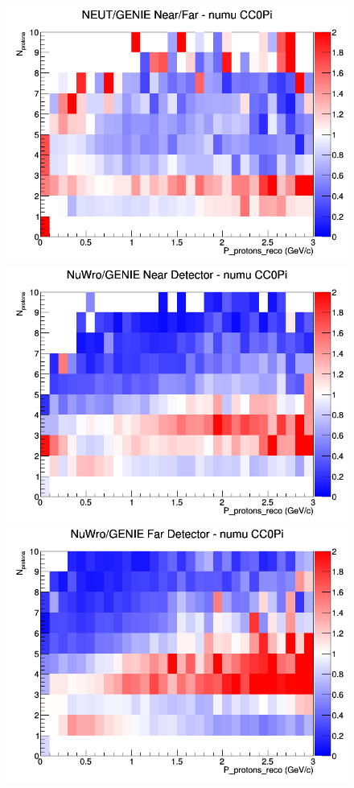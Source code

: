 \begin{figure}[h]
\endminipage
{}
\includegraphics[width=\linewidth]{eff_N_P/FGT/protons/ratios/CC0Pi_NEUT_GENIE_numu_NF_N_P.png}
\endminipage
\newline
{}
\includegraphics[width=\linewidth]{eff_N_P/FGT/protons/ratios/CC0Pi_NuWro_GENIE_numu_near_N_P.png}
\endminipage
{}
\includegraphics[width=\linewidth]{eff_N_P/FGT/protons/ratios/CC0Pi_NuWro_GENIE_numu_far_N_P.png}

\end{figure}
